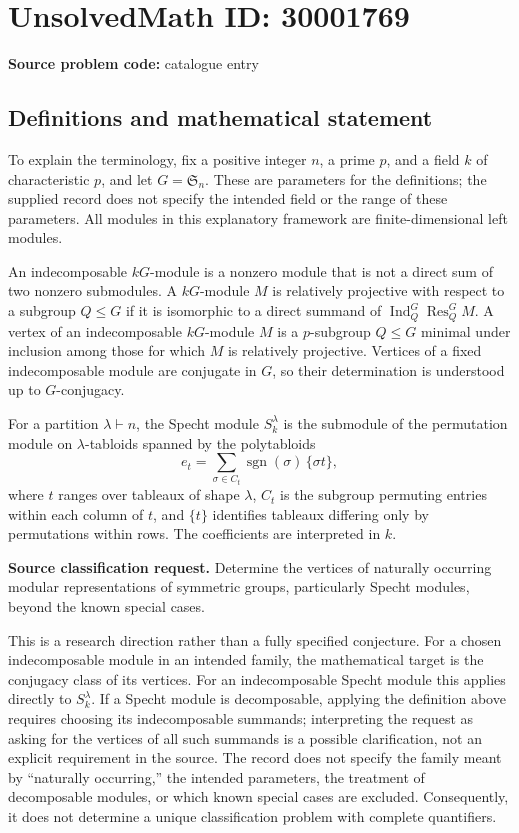 \documentclass[11pt]{article}
\begin{document}
\section*{UnsolvedMath ID: 30001769}
\textbf{Source problem code:} catalogue entry
\subsection{Definitions and mathematical statement}
To explain the terminology, fix a positive integer \(n\), a prime \(p\), and a field \(k\) of characteristic \(p\), and let \(G=\mathfrak S_n\). These are parameters for the definitions; the supplied record does not specify the intended field or the range of these parameters. All modules in this explanatory framework are finite-dimensional left modules.

An indecomposable \(kG\)-module is a nonzero module that is not a direct sum of two nonzero submodules. A \(kG\)-module \(M\) is relatively projective with respect to a subgroup \(Q\leq G\) if it is isomorphic to a direct summand of \(\operatorname{Ind}_Q^G\operatorname{Res}_Q^G M\). A vertex of an indecomposable \(kG\)-module \(M\) is a \(p\)-subgroup \(Q\leq G\) minimal under inclusion among those for which \(M\) is relatively projective. Vertices of a fixed indecomposable module are conjugate in \(G\), so their determination is understood up to \(G\)-conjugacy.

For a partition \(\lambda\vdash n\), the Specht module \(S_k^\lambda\) is the submodule of the permutation module on \(\lambda\)-tabloids spanned by the polytabloids
\[
 e_t=\sum_{\sigma\in C_t}\operatorname{sgn}(\sigma)\,\{\sigma t\},
\]
where \(t\) ranges over tableaux of shape \(\lambda\), \(C_t\) is the subgroup permuting entries within each column of \(t\), and \(\{t\}\) identifies tableaux differing only by permutations within rows. The coefficients are interpreted in \(k\).

\textbf{Source classification request.} Determine the vertices of naturally occurring modular representations of symmetric groups, particularly Specht modules, beyond the known special cases.

This is a research direction rather than a fully specified conjecture. For a chosen indecomposable module in an intended family, the mathematical target is the conjugacy class of its vertices. For an indecomposable Specht module this applies directly to \(S_k^\lambda\). If a Specht module is decomposable, applying the definition above requires choosing its indecomposable summands; interpreting the request as asking for the vertices of all such summands is a possible clarification, not an explicit requirement in the source. The record does not specify the family meant by ``naturally occurring,'' the intended parameters, the treatment of decomposable modules, or which known special cases are excluded. Consequently, it does not determine a unique classification problem with complete quantifiers.
\end{document}
